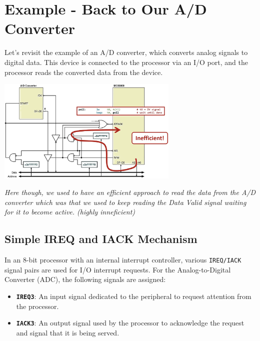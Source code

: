 \section{Example - Back to Our A/D Converter}
Let's revisit the example of an A/D converter, which converts analog signals to digital data. This device is connected to the processor via an I/O port, and the processor reads the converted data from the device. \\
\begin{center}
    \includegraphics[width=0.65\textwidth]{chapters/chapter2d/images/adc.png}
\end{center}
\textit{Here though, we used to have an efficient approach to read the data from the A/D converter which was that we used to keep reading the Data Valid signal waiting for it to become active. (highly inneficient)} \\

\subsection{Simple IREQ and IACK Mechanism}

In an 8-bit processor with an internal interrupt controller, various \texttt{IREQ/IACK} signal pairs are used for I/O interrupt requests. For the Analog-to-Digital Converter (ADC), the following signals are assigned:

\begin{itemize}
    \item \textbf{\texttt{IREQ3}}: An input signal dedicated to the peripheral to request attention from the processor.
    \item \textbf{\texttt{IACK3}}: An output signal used by the processor to acknowledge the request and signal that it is being served.
\end{itemize}

